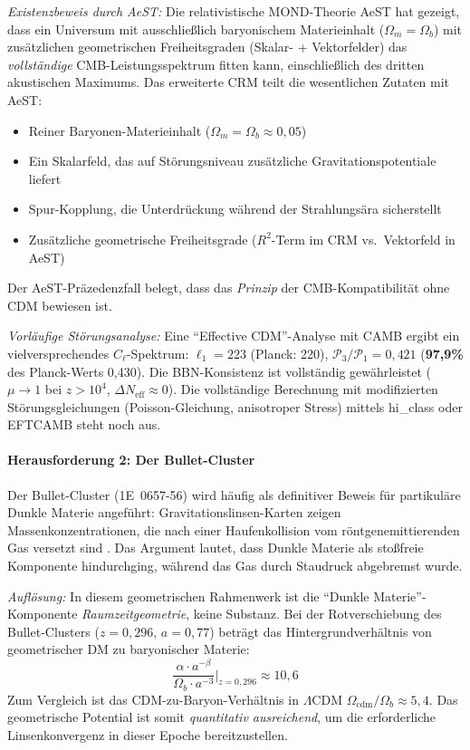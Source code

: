 \documentclass[aps,prd,twocolumn,superscriptaddress,nofootinbib]{revtex4-2}
\begin{document}
\textit{Existenzbeweis durch AeST:} Die relativistische MOND-Theorie AeST \cite{Skordis2021} hat gezeigt, dass ein Universum mit ausschließlich baryonischem Materieinhalt ($\Omega_m = \Omega_b$) mit zus\"atzlichen geometrischen Freiheitsgraden (Skalar- + Vektorfelder) das \textit{vollst\"andige} CMB-Leistungsspektrum fitten kann, einschließlich des dritten akustischen Maximums. Das erweiterte CRM teilt die wesentlichen Zutaten mit AeST:
\begin{itemize}
\item Reiner Baryonen-Materieinhalt ($\Omega_m = \Omega_b \approx 0{,}05$)
\item Ein Skalarfeld, das auf St\"orungsniveau zus\"atzliche Gravitationspotentiale liefert
\item Spur-Kopplung, die Unterdr\"uckung w\"ahrend der Strahlungs\"ara sicherstellt
\item Zus\"atzliche geometrische Freiheitsgrade ($R^2$-Term im CRM vs.\ Vektorfeld in AeST)
\end{itemize}

Der AeST-Pr\"azedenzfall belegt, dass das \textit{Prinzip} der CMB-Kompatibilit\"at ohne CDM bewiesen ist.

\textit{Vorl\"aufige St\"orungsanalyse:} Eine "`Effective CDM"'-Analyse mit CAMB \cite{Lewis2000} ergibt ein vielversprechendes $C_\ell$-Spektrum: $\ell_1 = 223$ (Planck: 220), $\mathcal{P}_3/\mathcal{P}_1 = 0{,}421$ (\textbf{97{,}9\%} des Planck-Werts 0{,}430). Die BBN-Konsistenz ist vollst\"andig gew\"ahrleistet ($\mu \to 1$ bei $z > 10^4$, $\Delta N_{\mathrm{eff}} \approx 0$). Die vollst\"andige Berechnung mit modifizierten St\"orungsgleichungen (Poisson-Gleichung, anisotroper Stress) mittels hi\_class \cite{Zumalacarregui2017} oder EFTCAMB \cite{Hu2014} steht noch aus.

\paragraph{Herausforderung 2: Der Bullet-Cluster}

Der Bullet-Cluster (1E~0657-56) wird h\"aufig als definitiver Beweis f\"ur partikul\"are Dunkle Materie angef\"uhrt: Gravitationslinsen-Karten zeigen Massenkonzentrationen, die nach einer Haufenkollision vom r\"ontgenemittierenden Gas versetzt sind \cite{Clowe2006}. Das Argument lautet, dass Dunkle Materie als stoßfreie Komponente hindurchging, w\"ahrend das Gas durch Staudruck abgebremst wurde.

\textit{Aufl\"osung:} In diesem geometrischen Rahmenwerk ist die "`Dunkle Materie"'-Komponente \textit{Raumzeitgeometrie}, keine Substanz. Bei der Rotverschiebung des Bullet-Clusters ($z = 0{,}296$, $a = 0{,}77$) betr\"agt das Hintergrundverh\"altnis von geometrischer DM zu baryonischer Materie:
\begin{equation}
\frac{\alpha \cdot a^{-\beta}}{\Omega_b \cdot a^{-3}} \bigg|_{z=0{,}296} \approx 10{,}6
\end{equation}
Zum Vergleich ist das CDM-zu-Baryon-Verh\"altnis in $\Lambda$CDM $\Omega_{\mathrm{cdm}}/\Omega_b \approx 5{,}4$. Das geometrische Potential ist somit \textit{quantitativ ausreichend}, um die erforderliche Linsenkonvergenz in dieser Epoche bereitzustellen.
\end{document}

